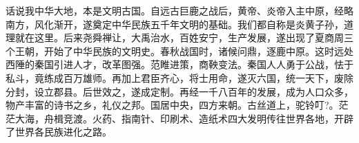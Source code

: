 \clearpage
\begin{center}
\scalebox{3}{中华人民共和国演义}
\end{center}
\par
{\fzbys
\Large
话说我中华大地，本是文明古国。自远古巨鹿之战后，黄帝、炎帝入主中原，经略南方，风化渐开，遂奠定中华民族五千年文明的基础。我们都自称是炎黄子孙，道理就在这里。后来尧舜禅让，大禹治水，百姓安宁，生产发展，遂出现了夏商周三个王朝，开始了中华民族的文明史。春秋战国时，诸候问鼎，逐鹿中原。这时远处西陲的秦国引进人才，改革图强。范睢进策，商鞅变法。秦国人人勇于公战，怯于私斗，竟练成百万雄师。再加上君臣齐心，将士用命，遂灭六国，统一天下，废除分封，设立郡县。后世效之，遂成定制。再经一千八百年的发展，成为人口众多，物产丰富的诗书之乡，礼仪之邦。国居中央，四方来朝。古丝道上，驼铃叮?。茫茫大海，舟楫竞渡。火药、指南针、印刷术、造纸术四大发明传往世界各地，开辟了世界各民族进化之路。
}
